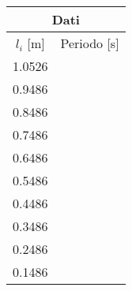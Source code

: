 \begin{SCtable}
    \centering
    \begin{tabular}{c c}
        \multicolumn{2}{c}{\textbf{Dati}} \\
        \toprule
        $l_i$ [m] & Periodo [s] \\
        \midrule
        1.0526 &  \\
        0.9486 &  \\
        0.8486 &  \\
        0.7486 &  \\
        0.6486 &  \\
        0.5486 &  \\
        0.4486 &  \\
        0.3486 &  \\
        0.2486 &  \\
        0.1486 &  \\
        \bottomrule
    \end{tabular}
    \caption{}
    \label{tab:l_dati}
\end{SCtable}
